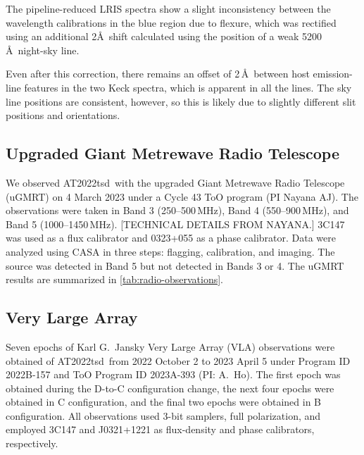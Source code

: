 \documentclass{nature_plusfigure}
\newcommand{\at}{AT2022tsd}
\begin{document}
\begin{methods}
The pipeline-reduced LRIS spectra show a slight inconsistency between the wavelength calibrations in the blue region due to flexure, which was rectified using an additional 2\AA\ shift calculated using the position of a weak 5200\,\AA\ night-sky line.

Even after this correction, there remains an offset of 2\,\AA\ between host emission-line features in the two Keck spectra, which is apparent in all the lines. The sky line positions are consistent, however, so this is likely due to slightly different slit positions and orientations. 


\subsection{Upgraded Giant Metrewave Radio Telescope}
\label{sec:GMRT}

We observed \at\ with the upgraded Giant Metrewave Radio Telescope (uGMRT) on 4 March 2023 under a Cycle 43 ToO program (PI Nayana AJ). The observations were taken in Band 3 (250--500\,MHz), Band 4 (550--900\,MHz), and Band 5 (1000--1450\,MHz). [TECHNICAL DETAILS FROM NAYANA.] 3C147 was used as a flux calibrator and 0323+055 as a phase calibrator. Data were analyzed using CASA in three steps: flagging, calibration, and imaging. 
The source was detected in Band 5 but not detected in Bands 3 or 4.
The uGMRT results are summarized in \ref{tab:radio-observations}.

\subsection{Very Large Array}
\label{sec:VLA}

Seven epochs of Karl G.\ Jansky Very Large Array (VLA\cite{Perley2011}) observations were obtained of \at\ from 2022 October 2 to 2023 April 5 under Program ID 2022B-157 and ToO Program ID 2023A-393 (PI: A.\ Ho).
The first epoch was obtained during the D-to-C configuration change, the next four epochs were obtained in C configuration, and the final two epochs were obtained in B configuration.
All observations used 3-bit samplers, full polarization, and employed 3C147 and J0321+1221 as flux-density and phase calibrators, respectively.


\end{methods}
\end{document}
